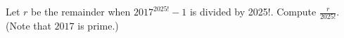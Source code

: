 Let $r$ be the remainder when $2017^{2025!}-1$ is divided by 2025!. Compute $\frac{r}{2025!}$. (Note that $2017$ is prime.)